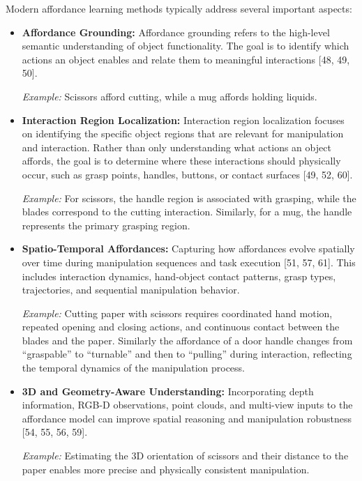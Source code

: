 Modern affordance learning methods typically address several important aspects:
\begin{itemize}
    \item \textbf{Affordance Grounding:} 
    Affordance grounding refers to the high-level semantic understanding of object functionality. The goal is to identify which actions an object enables and relate them to meaningful interactions [48, 49, 50].

    \textit{Example:} Scissors afford cutting, while a mug affords holding liquids.

    \item \textbf{Interaction Region Localization:} Interaction region localization focuses on identifying the specific object regions that are relevant for manipulation and interaction. Rather than only understanding what actions an object affords, the goal is to determine where these interactions should physically occur, such as grasp points, handles, buttons, or contact surfaces [49, 52, 60].
    
    \textit{Example:} For scissors, the handle region is associated with grasping, while the blades correspond to the cutting interaction. Similarly, for a mug, the handle represents the primary grasping region.

    \item \textbf{Spatio-Temporal Affordances:} 
    Capturing how affordances evolve spatially over time during manipulation sequences and task execution [51, 57, 61]. 
    This includes interaction dynamics, hand-object contact patterns, grasp types, trajectories, and sequential manipulation behavior.

    \textit{Example:} Cutting paper with scissors requires coordinated hand motion, repeated opening and closing actions, and continuous contact between the blades and the paper. 
    Similarly the affordance of a door handle changes from ``graspable'' to ``turnable'' and then to ``pulling'' during interaction, reflecting the temporal dynamics of the manipulation process.

    \item \textbf{3D and Geometry-Aware Understanding:} 
    Incorporating depth information, RGB-D observations, point clouds, and multi-view inputs to the affordance model can improve spatial reasoning and manipulation robustness [54, 55, 56, 59].

    \textit{Example:} Estimating the 3D orientation of scissors and their distance to the paper enables more precise and physically consistent manipulation.
\end{itemize}

